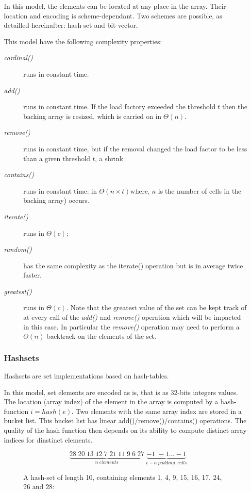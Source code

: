 \documentclass{article}
\newcommand{\complexityvalue}[1]{$\Theta(#1)$}
\newcommand{\prmtv}[1]{\textit{#1()}}
\begin{document}
In this model, the elements can be located at any place in the array. Their location and encoding is scheme-dependant. Two
schemes are possible, as detailled hereinafter: hash-set and bit-vector. 

This model have the following complexity properties:
\begin{description}
\item[\prmtv{cardinal}] runs in constant time.
\item[\prmtv{add}] runs in constant time. If the load factory exceeded the threshold $t$ then the backing array is resized, which is
carried on in \complexityvalue{n}.
\item[\prmtv{remove}] runs in constant time, but if the removal changed the load factor to be less than a given threshold $t$, a shrink
\item[\prmtv{contains}]  runs in constant time;
in \complexityvalue{n \times t}{where, $n$ is the number of cells in the backing array)} occurs.
\item[\prmtv{iterate}] runs in \complexityvalue{c};
\item[\prmtv{random}] has the same complexity as the iterate() operation but is in average twice faster.
\item[\prmtv{greatest}] runs in \complexityvalue{c}. Note that the greatest value of the set can be kept track of
at every call of the  \prmtv{add} and \prmtv{remove} operation which will be impacted in this case.
In particular the \prmtv{remove} operation may need to perform a \complexityvalue{n} backtrack on the elements of the set.
\end{description}


\subsubsection{Hashsets}

Hashsets are set implementations based on hash-tables.

In this model, set elements are encoded as is, that is as 32-bits integers values.
The location (array index) of the element in the array is computed by a hash-function $i = hash(e)$.
Two elements with the same array index are stored in a bucket list. This bucket list has linear
add()/remove()/contains() operations. The quality of the hash function then
depends on its ability to compute distinct array indices for dinstinct elements.

\begin{figure}
$$
\;\;\underbrace{28\;20\;13\;12\;7\;21\;11\;9\;6\;27}_{n\;elements}\;\underbrace{-1\;-1\ldots-1}_{c-n\;padding\;\;cells}
$$
\caption{A  hash-set of length 10, containing elements  1, 4, 9, 15, 16, 17, 24, 26 and 28:}
\end{figure}
\end{document}
